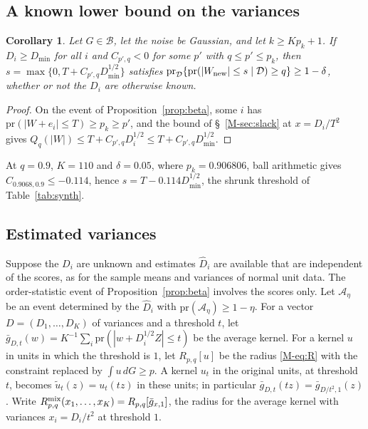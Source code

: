 \documentclass[11pt]{article}
\renewcommand{\_}{\usc\allowbreak}
\newtheorem{corollary}{Corollary}
\newcommand{\pr}{\mathrm{pr}}
\begin{document}
\subsection*{A known lower bound on the variances}

\begin{corollary}\label{cor:simple}
Let $G \in \mathcal B$, let the noise be Gaussian, and let $k \ge Kp_k + 1$. If $D_i \ge D_{\min}$ for all $i$ and $C_{p',q} < 0$ for some $p'$ with $q \le p' \le p_k$, then $s = \max\{0, T + C_{p',q}D_{\min}^{1/2}\}$ satisfies $\pr_{\mathcal D}\{\pr(|W_{\rm new}| \le s \mid \mathcal D) \ge q\} \ge 1 - \delta$, whether or not the $D_i$ are otherwise known.
\end{corollary}

\begin{proof}
On the event of Proposition~\ref{prop:beta}, some $i$ has $\pr(|W + e_i| \le T) \ge p_k \ge p'$, and the bound of \S~\ref{M-sec:slack} at $x = D_i/T^2$ gives $Q_q(|W|) \le T + C_{p',q}D_i^{1/2} \le T + C_{p',q}D_{\min}^{1/2}$.
\end{proof}

At $q = 0.9$, $K = 110$ and $\delta = 0.05$, where $p_k = 0.906806$, ball arithmetic gives $C_{0.9068,0.9} \le -0.114$, hence $s = T - 0.114 D_{\min}^{1/2}$, the shrunk threshold of Table~\ref{tab:synth}.

\subsection*{Estimated variances}

Suppose the $D_i$ are unknown and estimates $\hat D_i$ are available that are independent of the scores, as for the sample means and variances of normal unit data. The order-statistic event of Proposition~\ref{prop:beta} involves the scores only. Let $\mathcal A_\eta$ be an event determined by the $\hat D_i$ with $\pr(\mathcal A_\eta) \ge 1 - \eta$. For a vector $D = (D_1, \ldots, D_K)$ of variances and a threshold $t$, let $\bar g_{D,t}(w) = K^{-1}\sum_i \pr(|w + D_i^{1/2}Z| \le t)$ be the average kernel. For a kernel $u$ in units in which the threshold is $1$, let $R_{p,q}[u]$ be the radius \eqref{M-eq:R} with the constraint replaced by $\int u\,dG \ge p$. A kernel $u_t$ in the original units, at threshold $t$, becomes $\widetilde u_t(z) = u_t(tz)$ in these units; in particular $\bar g_{D,t}(tz) = \bar g_{D/t^2,1}(z)$. Write $R^{\rm mix}_{p,q}(x_1, \ldots, x_K) = R_{p,q}[\bar g_{x,1}]$, the radius for the average kernel with variances $x_i = D_i/t^2$ at threshold $1$.
\end{document}
